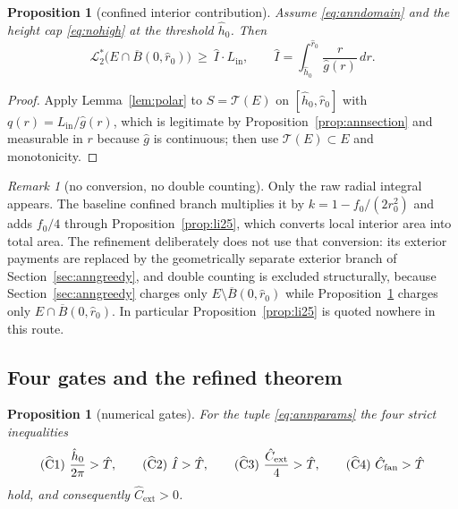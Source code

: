 \documentclass[11pt]{article}
\theoremstyle{plain}
\newtheorem{proposition}[theorem]{Proposition}
\theoremstyle{definition}
\theoremstyle{remark}
\newtheorem{remark}[theorem]{Remark}
\newcommand{\Lout}{\mathcal{L}^{*}_{2}}
\newcommand{\Tri}{\mathcal{T}}
\begin{document}
\begin{proposition}[confined interior contribution]\label{prop:annconfined}
Assume \eqref{eq:anndomain} and the height cap \eqref{eq:nohigh} at the
threshold $\hat h_{0}$. Then
\[
  \Lout\bigl(E\cap\overline B(0,\hat r_{0})\bigr)
  \ \ge\ \hat I\cdot L_{\mathrm{in}},
  \qquad
  \hat I=\int_{\hat h_{0}}^{\hat r_{0}}\frac{r}{\hat g(r)}\,dr .
\]
\end{proposition}

\begin{proof}
Apply Lemma~\ref{lem:polar} to $S=\Tri(E)$ on $[\hat h_{0},\hat r_{0}]$ with
$q(r)=L_{\mathrm{in}}/\hat g(r)$, which is legitimate by
Proposition~\ref{prop:annsection} and measurable in $r$ because $\hat g$ is
continuous; then use $\Tri(E)\subset E$ and monotonicity.
\end{proof}

\begin{remark}[no conversion, no double counting]\label{rem:annnoli25}
Only the raw radial integral appears. The baseline confined branch multiplies
it by $k=1-f_{0}/(2r_{0}^{2})$ and adds $f_{0}/4$ through
Proposition~\ref{prop:li25}, which converts local interior area into total
area. The refinement deliberately does not use that conversion: its exterior
payments are replaced by the geometrically separate exterior branch of
Section~\ref{sec:anngreedy}, and double counting is excluded structurally,
because Section~\ref{sec:anngreedy} charges only
$E\setminus\overline B(0,\hat r_{0})$ while
Proposition~\ref{prop:annconfined} charges only
$E\cap\overline B(0,\hat r_{0})$. In particular
Proposition~\ref{prop:li25} is quoted nowhere in this route.
\end{remark}

\subsection{Four gates and the refined theorem}\label{sec:anngates}

\begin{proposition}[numerical gates]\label{prop:anngates}
For the tuple \eqref{eq:annparams} the four strict inequalities
\begin{equation}\label{eq:anngates}
  \textup{($\widehat{\mathrm{C}}1$)}\ \frac{\hat h_{0}}{2\pi}>\hat T,
  \qquad
  \textup{($\widehat{\mathrm{C}}2$)}\ \hat I>\hat T,
  \qquad
  \textup{($\widehat{\mathrm{C}}3$)}\ \frac{\hat C_{\mathrm{ext}}}{4}>\hat T,
  \qquad
  \textup{($\widehat{\mathrm{C}}4$)}\ \hat C_{\mathrm{fan}}>\hat T
\end{equation}
hold, and consequently $\hat C_{\mathrm{ext}}>0$.
\end{proposition}
\end{document}
